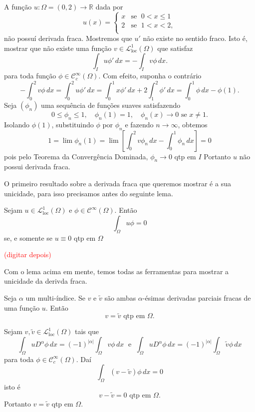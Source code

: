 \documentclass[a4paper, 11pt]{book}
\theoremstyle{definition}
\newcommand{\bR}{\mathbb{R}}
\newcommand{\cC}{\mathcal{C}}
\newcommand{\cL}{\mathcal{L}}
\newcommand{\loc}{\mathrm{loc}}
\begin{document}
\begin{ex}
    A função $u : \Omega  = (0,2) \to \bR$ dada por
    \[
        u(x) = \left\{
            \begin{array}{rl}
                x & \text{se }\; 0 < x \leqslant 1\\
                2 & \text{se }\; 1 < x < 2,\\
            \end{array}
        \right.
    \]
    não possuí derivada fraca.
    Mostremos que $u'$ não existe no sentido fraco.
    Isto é, mostrar que não existe uma função $v \in \cL^1_\loc(\Omega)$ que satisfaz
    \[
        \int_I u \phi' \, dx = -\int_I v \phi \,dx.
    \]
    para toda função $\phi \in \cC_c^\infty(\Omega)$. 
    Com efeito, suponha o contrário
    \[
        -\int_0^2 v \phi \, dx = \int_0^2 u \phi' \,dx = \int_0^1 x \phi' \,dx + 2\int_1^2 \phi' \,dx = \int_0^1 \phi \,dx - \phi(1).
    \]
    Seja $(\phi_n)$ uma sequência de funções suaves satisfazendo
    \[
        0 \leqslant \phi_n \leqslant 1, \quad \phi_n(1) = 1, \quad \phi_n(x) \to 0 \text{ se } x \neq 1.
    \]
    Isolando $\phi(1)$, substituindo $\phi$ por $\phi_n$ e fazendo $n \to \infty$, obtemos
    \[
        1 = \lim \phi_n(1) = \lim \left[ \int_0^2 v \phi_n \, dx- \int_0^1 \phi_n \,dx \right] = 0
    \]
    pois pelo Teorema da Convergência Dominada, $\phi_n \to 0$ qtp em $I$
    Portanto $u$ não possui derivada fraca.
\end{ex}

O primeiro resultado sobre a derivada fraca que queremos mostrar é a sua unicidade, para isso precisamos antes do seguinte lema.

\begin{lbox}
    Sejam $u \in \cL^1_{\loc}(\Omega)$ e $\phi \in \cC^\infty(\Omega)$.
    Então
    \[
        \int_\Omega u \phi = 0
    \]
    se, e somente se $u \equiv 0$ qtp em $\Omega$
\end{lbox}
\begin{prf}
    \cite{brezis-functional.analysis} \textcolor{red}{(digitar depois)}
\end{prf}

Com o lema acima em mente, temos todas as ferramentas para mostrar a unicidade da derivda fraca.

\begin{pbox}
    Seja $\alpha$ um multi-índice. Se $v$ e $\tilde v$ são ambas $\alpha$-ésimas derivadas parciais fracas de uma função $u$.
    Então
    \[
        v = \tilde v \text{ qtp em } \Omega.
    \]
\end{pbox}
\begin{prf}
    Sejam $v, \tilde v \in \cL^1_{\mathrm{loc}}(\Omega)$ tais que
    \[
        \int_\Omega u D^\alpha \phi \,dx = (-1)^{|\alpha|} \int_\Omega v \phi \,dx \;\text{ e }\; \int_\Omega u D^\alpha \phi \, dx= (-1)^{|\alpha|}\int_\Omega \tilde v \phi \,dx
    \]
    para toda $\phi \in \cC^\infty_c(\Omega)$. Daí
    \[
        \int_\Omega (v - \tilde v) \phi \, dx = 0
    \]
    isto é
    \[
        v - \tilde v = 0 \text{ qtp em } \Omega.
    \]
    Portanto $v = \tilde v$ qtp em $\Omega$.
\end{prf}
\end{document}
